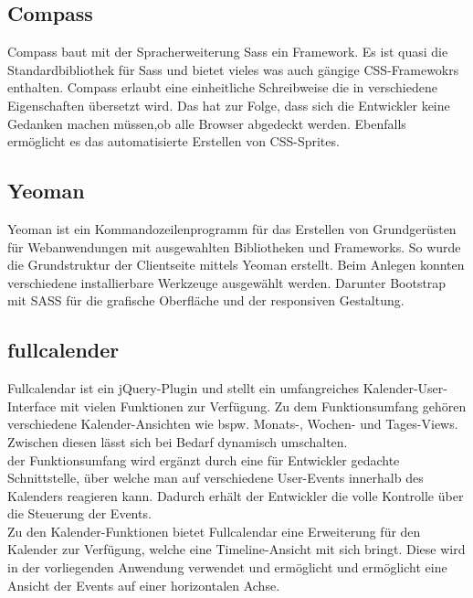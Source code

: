 \subsection{Compass}
Compass baut mit der Spracherweiterung Sass ein Framework. Es ist quasi die Standardbibliothek für Sass und bietet vieles was auch gängige CSS-Framewokrs enthalten. Compass erlaubt eine einheitliche Schreibweise die in verschiedene Eigenschaften übersetzt wird. Das hat zur Folge, dass sich die Entwickler keine Gedanken machen müssen,ob alle Browser abgedeckt werden. Ebenfalls ermöglicht es das automatisierte Erstellen von CSS-Sprites. 

\subsection{Yeoman}
Yeoman ist ein Kommandozeilenprogramm für das Erstellen von Grundgerüsten für Webanwendungen mit ausgewahlten Bibliotheken und Frameworks. So wurde die Grundstruktur der Clientseite mittels Yeoman erstellt. Beim Anlegen konnten verschiedene installierbare Werkzeuge ausgewählt werden. Darunter Bootstrap mit SASS für die grafische Oberfläche und der responsiven Gestaltung.

\subsection{fullcalender}
Fullcalendar ist ein jQuery-Plugin und stellt ein umfangreiches Kalender-User-Interface mit vielen Funktionen zur Verfügung. Zu dem Funktionsumfang gehören verschiedene Kalender-Ansichten
wie bspw. Monats-, Wochen- und Tages-Views. Zwischen diesen lässt sich bei Bedarf dynamisch umschalten.\\
der Funktionsumfang wird ergänzt durch eine für Entwickler gedachte Schnittstelle, über welche man auf verschiedene User-Events innerhalb des Kalenders reagieren kann.
Dadurch erhält der Entwickler die volle Kontrolle über die Steuerung der Events.\\
Zu den Kalender-Funktionen bietet Fullcalendar eine Erweiterung für den Kalender zur Verfügung, welche eine Timeline-Ansicht mit sich bringt. Diese wird in der vorliegenden Anwendung verwendet und ermöglicht
 und ermöglicht eine Ansicht der Events auf einer horizontalen Achse.

